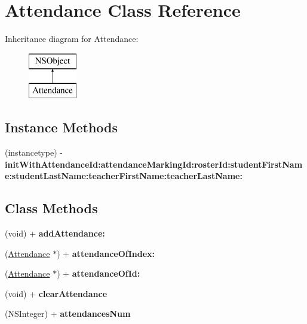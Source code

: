\hypertarget{interface_attendance}{\section{Attendance Class Reference}
\label{interface_attendance}
}
Inheritance diagram for Attendance\+:\begin{figure}[H]
\begin{center}
\leavevmode
\includegraphics[height=2.000000cm]{interface_attendance}
\end{center}
\end{figure}
\subsection*{Instance Methods}
\begin{DoxyCompactItemize}
\item 
\hypertarget{interface_attendance_a68fb6500814d74c3490f561a7d4cc8d1}{(instancetype) -\/ {\bfseries init\+With\+Attendance\+Id\+:attendance\+Marking\+Id\+:roster\+Id\+:student\+First\+Name\+:student\+Last\+Name\+:teacher\+First\+Name\+:teacher\+Last\+Name\+:}}\label{interface_attendance_a68fb6500814d74c3490f561a7d4cc8d1}

\end{DoxyCompactItemize}
\subsection*{Class Methods}
\begin{DoxyCompactItemize}
\item 
\hypertarget{interface_attendance_a568770e9ffe9657d639935eef3853fd0}{(void) + {\bfseries add\+Attendance\+:}}\label{interface_attendance_a568770e9ffe9657d639935eef3853fd0}

\item 
\hypertarget{interface_attendance_a5cb36b2e19d15648d4286c4806205d0f}{(\hyperlink{interface_attendance}{Attendance} $\ast$) + {\bfseries attendance\+Of\+Index\+:}}\label{interface_attendance_a5cb36b2e19d15648d4286c4806205d0f}

\item 
\hypertarget{interface_attendance_a3eaa11e5bc98ef472695fd08e6755e19}{(\hyperlink{interface_attendance}{Attendance} $\ast$) + {\bfseries attendance\+Of\+Id\+:}}\label{interface_attendance_a3eaa11e5bc98ef472695fd08e6755e19}

\item 
\hypertarget{interface_attendance_a80b16d181a194a740fc0c52dede6cbe3}{(void) + {\bfseries clear\+Attendance}}\label{interface_attendance_a80b16d181a194a740fc0c52dede6cbe3}

\item 
\hypertarget{interface_attendance_a5e9f293e1ce3603c9e795e76a06eac88}{(N\+S\+Integer) + {\bfseries attendances\+Num}}\label{interface_attendance_a5e9f293e1ce3603c9e795e76a06eac88}

\end{DoxyCompactItemize}
